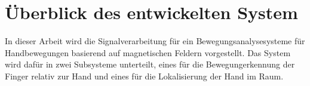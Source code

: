 


\section{Überblick des entwickelten System}
\label{sec:SystemOverview}
In dieser Arbeit wird die Signalverarbeitung für ein Bewegungsanalysesysteme für Handbewegungen basierend auf magnetischen Feldern vorgestellt. Das System wird dafür in zwei Subsysteme unterteilt, eines für die Bewegungerkennung der Finger relativ zur Hand und eines für die Lokalisierung der Hand im Raum.

